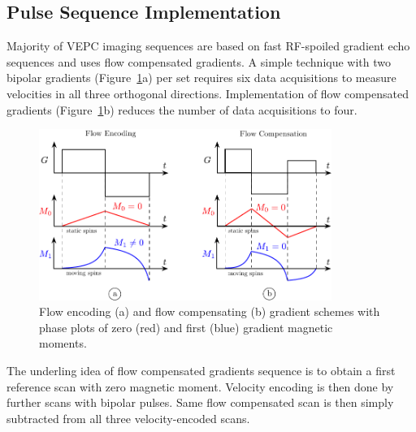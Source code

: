 \subsection{Pulse Sequence Implementation}
Majority of VEPC imaging sequences are based on fast RF-spoiled gradient echo sequences and uses flow compensated gradients.
A simple technique with two bipolar gradients (Figure~\ref{fig: FlowComp}a) per set requires six data acquisitions to measure velocities in all three orthogonal directions.
Implementation of flow compensated gradients (Figure~\ref{fig: FlowComp}b) reduces the number of data acquisitions to four.
\begin{figure}[!htb]
\vspace{+0.2cm}
\centering
\includegraphics[width=0.85\textwidth]{Figures/VEPC_FlowCompensations.pdf}
\caption[Flow encoding and flow compensating gradient schemes]{Flow encoding (a) and flow compensating (b) gradient schemes with phase plots of zero (red) and first (blue) gradient magnetic moments.}
\label{fig: FlowComp}
\end{figure}
The underling idea of flow compensated gradients sequence is to obtain a first reference scan with zero magnetic moment.
Velocity encoding is then done by further scans with bipolar pulses. 
Same flow compensated scan is then simply subtracted from all three velocity-encoded scans.

